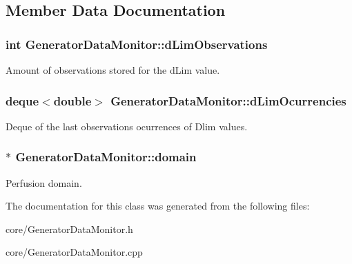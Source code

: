 \subsection{Member Data Documentation}
\subsubsection[{\texorpdfstring{d\+Lim\+Observations}{dLimObservations}}]{\setlength{\rightskip}{0pt plus 5cm}int Generator\+Data\+Monitor\+::d\+Lim\+Observations\hspace{0.3cm}{\ttfamily [private]}}\hypertarget{class_generator_data_monitor_aa6d072da586a1f39d63cb3b5ce293d5a}{}\label{class_generator_data_monitor_aa6d072da586a1f39d63cb3b5ce293d5a}
Amount of observations stored for the d\+Lim value. 
\subsubsection[{\texorpdfstring{d\+Lim\+Ocurrencies}{dLimOcurrencies}}]{\setlength{\rightskip}{0pt plus 5cm}deque$<$double$>$ Generator\+Data\+Monitor\+::d\+Lim\+Ocurrencies\hspace{0.3cm}{\ttfamily [private]}}\hypertarget{class_generator_data_monitor_a75372d1fc417bca41eb53895132cfc8c}{}\label{class_generator_data_monitor_a75372d1fc417bca41eb53895132cfc8c}
Deque of the last {\ttfamily observations} ocurrences of Dlim values. 
\subsubsection[{\texorpdfstring{domain}{domain}}]{$\ast$ Generator\+Data\+Monitor\+::domain\hspace{0.3cm}{\ttfamily [private]}}\hypertarget{class_generator_data_monitor_adb19db594dbfa2e5b5339c69a303e3ad}{}\label{class_generator_data_monitor_adb19db594dbfa2e5b5339c69a303e3ad}
Perfusion domain. 

The documentation for this class was generated from the following files\+:\begin{DoxyCompactItemize}
\item 
core/Generator\+Data\+Monitor.\+h\item 
core/Generator\+Data\+Monitor.\+cpp\end{DoxyCompactItemize}
